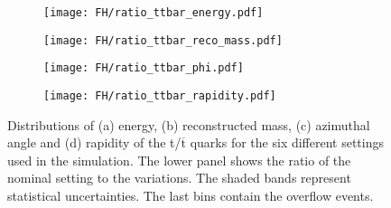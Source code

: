 \begin{figure}[H]
    \centering
    \begin{subfigure}{0.49\textwidth}
        \centering
        \texttt{[image: FH/ratio\_ttbar\_energy.pdf]}
        \caption{}
        \label{app:subfig:E(t,tbar)_FH}
    \end{subfigure}
    \begin{subfigure}{0.48\textwidth}
        \centering
        \texttt{[image: FH/ratio\_ttbar\_reco\_mass.pdf]}
        \caption{}
        \label{app:subfig:m(t,tbar)_FH}
    \end{subfigure}

    \vspace{0.2cm}
    
    \begin{subfigure}{0.49\textwidth}
        \centering
        \texttt{[image: FH/ratio\_ttbar\_phi.pdf]}
        \caption{}
        \label{app:subfig:phi(t,tbar)_FH}
    \end{subfigure}
    \begin{subfigure}{0.49\textwidth}
        \centering
        \texttt{[image: FH/ratio\_ttbar\_rapidity.pdf]}
        \caption{}
        \label{app:subfig:y(t,tbar)_FH}
    \end{subfigure}
    
    \caption{Distributions of (a) energy, (b)  reconstructed mass,  (c) azimuthal angle and (d) rapidity of the t/$\overline{\text{t}}$ quarks for the six different settings used in the simulation. The lower panel shows the ratio of the nominal setting to the variations. The shaded bands represent statistical uncertainties. The last bins contain the overflow events.}
    \label{app:fig:t,tbar_FH}
\end{figure}


